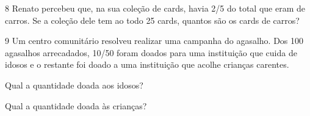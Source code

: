 {%
%
%
%
%
%
%
%


\num{8} Renato percebeu que, na sua coleção de cards, havia 2/5 do total que eram de carros. Se a coleção dele tem ao todo 25 cards,
quantos são os cards de carros?



\num{9} Um centro comunitário resolveu realizar uma campanha do agasalho.
Dos 100 agasalhos arrecadados, 10/50 foram doados para uma instituição
que cuida de idosos e o restante foi doado a uma instituição que acolhe
crianças carentes.

\begin{escolha}
\item
  Qual a quantidade doada aos idosos?


\item
  Qual a quantidade doada às crianças?

\end{escolha}


}
